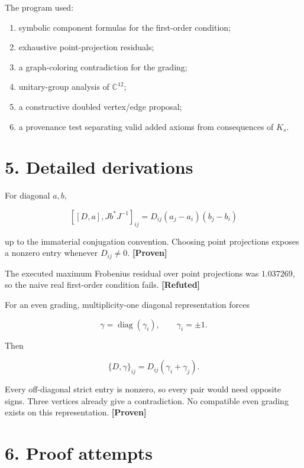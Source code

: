 \documentclass[11pt,a4paper,openany]{report}
\newcommand{\statusProven}{\textcolor{fingreen}{[Proven]}}
\newcommand{\statusRefuted}{\textcolor{finred}{[Refuted]}}
\begin{document}
The program used:

\begin{enumerate}
\item 
symbolic component formulas for the first-order condition;

\item 
exhaustive point-projection residuals;

\item 
a graph-coloring contradiction for the grading;

\item 
unitary-group analysis of \(\mathbb C^{12}\);

\item 
a constructive doubled vertex/\allowbreak{}edge proposal;

\item 
a provenance test separating valid added axioms from consequences of \(K_s\).

\end{enumerate}

\section{5. Detailed derivations}

For diagonal \(a,b\),

\[
[[D,a],Jb^*J^{-1}]_{ij}
=D_{ij}(a_j-a_i)(b_j-b_i)
\]

up to the immaterial conjugation convention. Choosing point projections exposes a nonzero entry whenever \(D_{ij}\ne0\). \textbf{\statusProven{}}

The executed maximum Frobenius residual over point projections was \(1.037269\), so the naive real first-order condition fails. \textbf{\statusRefuted{}}

For an even grading, multiplicity-one diagonal representation forces

\[
\gamma=\operatorname{diag}(\gamma_i),\qquad \gamma_i=\pm1.
\]

Then

\[
\{D,\gamma\}_{ij}=D_{ij}(\gamma_i+\gamma_j).
\]

Every off-diagonal strict entry is nonzero, so every pair would need opposite signs. Three vertices already give a contradiction. No compatible even grading exists on this representation. \textbf{\statusProven{}}

\section{6. Proof attempts}
\end{document}
